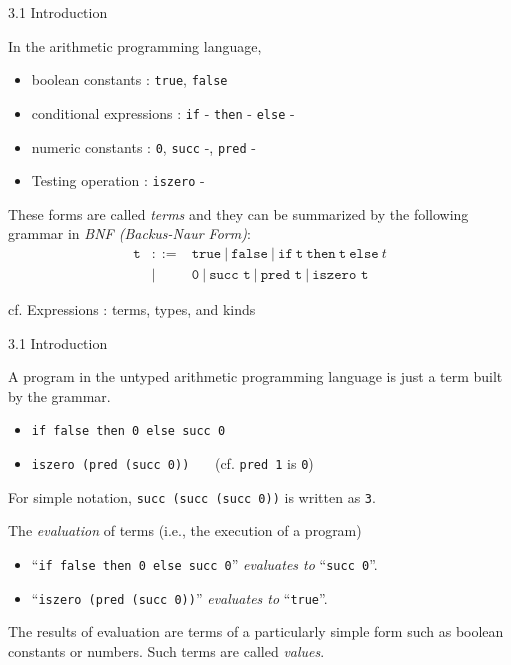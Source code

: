 \documentclass[table]{beamer}
\begin{document}
\begin{frame}[t]{3.1 Introduction} \vspace{10pt}

In the arithmetic programming language,
\begin{itemize}
\item boolean constants : \texttt{true}, \texttt{false}
\item conditional expressions : \texttt{if} - \texttt{then} - \texttt{else} -
\item numeric constants : \texttt{0}, \texttt{succ} -, \texttt{pred} -
\item Testing operation : \texttt{iszero} - 
\end{itemize}

\vspace{10pt}

These forms are called {\it terms} and they can be summarized by the following grammar in {\it BNF (Backus-Naur Form)}:
\begin{eqnarray*}
\texttt{t} & ::= & \texttt{true} \ | \ 
 \texttt{false} \ | \ 
 \texttt{if} \ \texttt{t} \ \texttt{then} \ \texttt{t} \ \texttt{else} \ t \\
 & | & \texttt{0} \ | \ 
 \texttt{succ t} \ | \ 
 \texttt{pred t} \ | \ 
 \texttt{iszero t} 
\end{eqnarray*}

cf. Expressions : terms, types, and kinds

\end{frame}

\begin{frame}[t]{3.1 Introduction} \vspace{10pt}

A program in the untyped arithmetic programming language is just a term built by the grammar. 
\begin{itemize}
\item \texttt{if false then 0 else succ 0}
\item \texttt{iszero (pred (succ 0))} \ \ \ (cf. \texttt{pred 1} is \texttt{0})
\end{itemize}

\vspace{10pt}

For simple notation, \texttt{succ (succ (succ 0))} is written as \texttt{3}.

\vspace{10pt}

The {\it evaluation} of terms (i.e., the execution of a program)
\begin{itemize}
\item ``\texttt{if false then 0 else succ 0}'' {\it evaluates to} ``\texttt{succ 0}''.
\item ``\texttt{iszero (pred (succ 0))}'' {\it evaluates to} ``\texttt{true}''.
\end{itemize}

\vspace{10pt}

The results of evaluation are terms of a particularly simple form such as boolean constants or numbers. Such terms are called {\it values}.

\end{frame}
\end{document}

